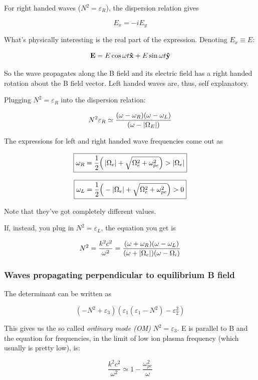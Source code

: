 \documentclass[PlasmaNotes.tex]{subfiles}
\begin{document}
For right handed waves ($N^2 = \varepsilon_R$), the dispersion relation gives

\[ E_x = -i E_y \]

What's physically interesting is the real part of the expression. Denoting $E_x \equiv E$:

\[ \mathbf{E} = E \cos{\omega t} \mathbf{\hat{x}} + E \sin{\omega t} \mathbf{\hat{y}} \] 

So the wave propagates along the B field and its electric field has a right handed rotation about the B field vector. Left handed waves are, thus, self explanatory.

Plugging $ N^2 = \varepsilon_R $ into the dispersion relation:

\[ N^2 \varepsilon_R \simeq \frac{(\omega-\omega_R)(\omega-\omega_L)}{(\omega-\left| \Omega_E \right|)} \]

The expressions for left and right handed wave frequencies come out as

\begin{equation}
\boxed{ \omega_R = \frac{1}{2} \Big(\left| \Omega_e \right| + \sqrt{\Omega_e^2 + \omega_{pe}^2} \Big) > \left| \Omega_e \right| }
\end{equation}

\begin{equation}
\boxed{ \omega_L = \frac{1}{2} \Big(-\left| \Omega_e \right| + \sqrt{\Omega_e^2 + \omega_{pe}^2} \Big) > 0  }
\end{equation}

Note that they've got completely different values.

If, instead, you plug in $N^2 = \varepsilon_L$, the equation you get is

\[ N^2 = \frac{k^2c^2}{\omega^2} = \frac{(\omega+\omega_R)(\omega-\omega_L)}{(\omega+\left| \Omega_e \right|)(\omega-\Omega_i)} \]


\subsubsection{Waves propagating perpendicular to equilibrium B field}

The determinant can be written as

\[ (-N^2+\varepsilon_3)(\varepsilon_1(\varepsilon_1-N^2)-\varepsilon_2^2) \]

This gives us the so called \emph{ordinary mode (OM)} $N^2 = \varepsilon_3$. E is parallel to B and the equation for frequencies, in the limit of low ion plasma frequency (which usually is pretty low), is:

\[ \frac{k^2c^2}{\omega^2} \simeq 1-\frac{\omega_{pe}^2}{\omega} \]
\end{document}
